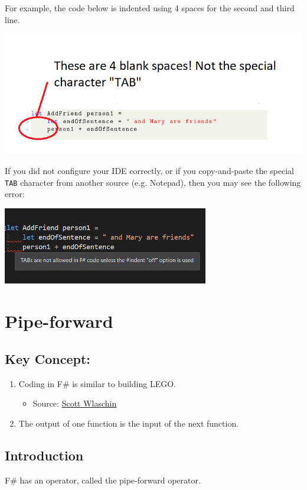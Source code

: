 \documentclass[12pt]{article}
\begin{document}
For example, the code below is indented using 4 spaces for the second and third line.
\begin{center}
\includegraphics[width=16cm]{pictures/picture19.png}
\end{center}
If you did not configure your IDE correctly, or if you copy-and-paste the special \texttt{TAB} character from another source (e.g. Notepad), then you may see the following error:
\begin{center}
\includegraphics[width=9cm]{pictures/picture20.png}
\end{center}
\pagebreak

\section{Pipe-forward}
\subsection*{Key Concept:}
\begin{enumerate}
\item Coding in F\# is similar to building LEGO. 
\begin{itemize}
\item Source: \href{https://fsharpforfunandprofit.com/posts/defining-functions/}{Scott Wlaschin}
\end{itemize}
\item The output of one function is the input of the next function.
\end{enumerate}

\subsection{Introduction}
F\# has an operator, called the pipe-forward operator. 
\end{document}
